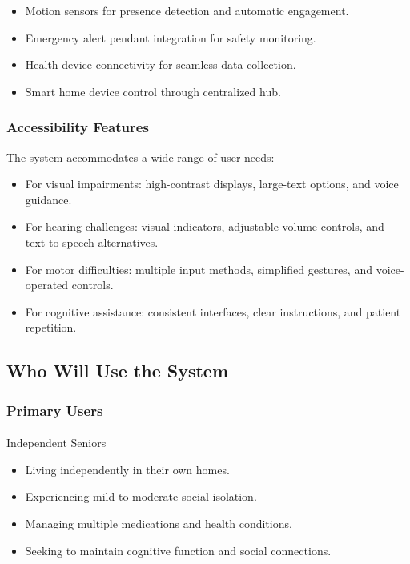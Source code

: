 \documentclass[
  letterpaper,
  DIV=11,
  numbers=noendperiod]{scrartcl}
\makeatletter
\let\oldparagraph\paragraph
\renewcommand{\paragraph}{
    \@ifstar
      \xxxParagraphStar
      \xxxParagraphNoStar
  }
\newcommand{\xxxParagraphStar}[1]{\oldparagraph*{#1}\mbox{}}
\newcommand{\xxxParagraphNoStar}[1]{\oldparagraph{#1}\mbox{}}
\providecommand{\tightlist}{%
  \setlength{\itemsep}{0pt}\setlength{\parskip}{0pt}}\usepackage{longtable,booktabs,array}
\makeatother
\begin{document}
\begin{itemize}
\tightlist
\item
  Motion sensors for presence detection and automatic engagement.
\item
  Emergency alert pendant integration for safety monitoring.
\item
  Health device connectivity for seamless data collection.
\item
  Smart home device control through centralized hub.
\end{itemize}

\subsubsection{Accessibility Features}\label{accessibility-features}

The system accommodates a wide range of user needs:

\begin{itemize}
\tightlist
\item
  For visual impairments: high-contrast displays, large-text options,
  and voice guidance.
\item
  For hearing challenges: visual indicators, adjustable volume controls,
  and text-to-speech alternatives.
\item
  For motor difficulties: multiple input methods, simplified gestures,
  and voice-operated controls.
\item
  For cognitive assistance: consistent interfaces, clear instructions,
  and patient repetition.
\end{itemize}

\subsection{Who Will Use the System}\label{who-will-use-the-system}

\subsubsection{Primary Users}\label{primary-users}

\paragraph{Independent Seniors}\label{independent-seniors}

\begin{itemize}
\tightlist
\item
  Living independently in their own homes.
\item
  Experiencing mild to moderate social isolation.
\item
  Managing multiple medications and health conditions.
\item
  Seeking to maintain cognitive function and social connections.
\end{itemize}
\end{document}
